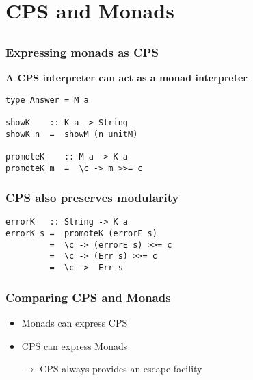\documentclass{beamer}
\begin{document}
\section{CPS and Monads}
\subsection{}
\begin{frame}[fragile]
\frametitle{Expressing monads as CPS}
\textbf{A CPS interpreter can act as a monad interpreter}
\begin{lstlisting}
type Answer = M a

showK    :: K a -> String
showK n  =  showM (n unitM)

promoteK    :: M a -> K a
promoteK m  =  \c -> m >>= c
\end{lstlisting}


\end{frame}


\begin{frame}[fragile]
\frametitle{CPS also preserves modularity}
\begin{lstlisting}
errorK   :: String -> K a
errorK s =  promoteK (errorE s)
         =  \c -> (errorE s) >>= c
         =  \c -> (Err s) >>= c
         =  \c ->  Err s
\end{lstlisting}

\end{frame}


\begin{frame}[fragile]
\frametitle{Comparing CPS and Monads}
\begin{itemize}
\item Monads can express CPS
\item CPS can express Monads
\item[$\rightarrow$] CPS always provides an escape facility
\end{itemize}
\end{frame}
\end{document}
